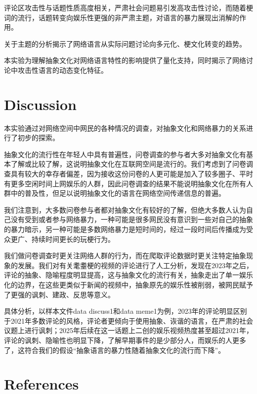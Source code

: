 \documentclass[12pt,a4paper]{ctexart}
\begin{document}
评论区攻击性与话题性质高度相关，严肃社会问题易引发高攻击性讨论，而随着梗词的流行，话题转变向娱乐性更强的非严肃主题，对语言的暴力展现出消解的作用。

关于主题的分析揭示了网络语言从实际问题讨论向多元化、梗文化转变的趋势。

本实验为理解抽象文化对网络语言特性的影响提供了量化支持，同时揭示了网络讨论中攻击性语言的动态变化特征。



\section{Discussion}
本实验通过对网络空间中网民的各种情况的调查，对抽象文化和网络暴力的关系进行了初步的探索。

抽象文化的流行性在年轻人中具有普遍性，问卷调查的参与者大多对抽象文化有基本了解或比较了解，这说明抽象文化在互联网空间是流行的。我们考虑到了问卷调查具有较大的幸存者偏差，因为接收这份问卷的人更可能是加入了较多圈子、平时有更多空闲时间上网娱乐的人群，因此问卷调查的结果不能说明抽象文化在所有人群中的普及性，但足以说明抽象文化的语言在网络空间传递信息的普遍。

我们注意到，大多数问卷参与者都对抽象文化有较好的了解，但绝大多数人认为自己没有受到或者参与网络暴力，一种可能是很多网民没有意识到一些对自己的抽象的暴力暗示，另一种可能是多数网络暴力是短时间的，经过一段时间后传播成为受众更广、持续时间更长的玩梗行为。

我们做问卷调查时更关注网络人群的行为，而在爬取评论数据时更关注特定抽象现象的发展。我们对有关耄耋梗的视频的评论进行了人工分析，发现在2023年之后，评论的抽象、隐喻程度明显提高，这与抽象文化的流行有关，抽象走出了单一娱乐化的边界，在这些更类似于新闻的视频中，抽象原先的娱乐性被削弱，被网民赋予了更强的讽刺、建政、反思等意义。

具体分析，以样本文件data discuss1和data meme1为例，2023年的评论明显区别于2021年多数评论的风格，评论者更倾向于使用抽象、诙谐的语言，在严肃的社会议题上进行讽刺；2025年后续在这一话题上二创的娱乐视频热度甚至超过2021年，评论的讽刺、隐喻性也明显下降，了解早期事件的是少部分人，而娱乐的人更多了，这符合我们的假设“抽象语言的暴力性随着抽象文化的流行而下降”。


\section{References}
\end{document}
